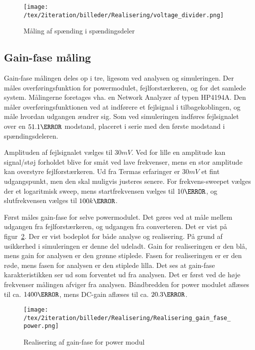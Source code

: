 \begin{figure}[H]
	\center
	\texttt{[image: /tex/2iteration/billeder/Realisering/voltage\_divider.png]}
	\caption{Måling af spænding i spændingsdeler}
	\label{fig:voltage_divider_realisering}
\end{figure}

\subsection{Gain-fase måling} \label{gain_fase_2}
Gain-fase målingen deles op i tre, ligesom ved analysen og simuleringen. Der måles overføringsfunktion for powermodulet, fejlforstærkeren, og for det samlede system. Målingerne foretages vha. en Network Analyzer af typen HP4194A\cite{hp4194}. Den måler overføringsfunktionen ved at indførere et fejlsignal i tilbagekoblingen, og måle hvordan udgangen ændrer sig. Som ved simuleringen indføres fejlsignalet over en $51.1\ohm$ modstand, placeret i serie med den første modstand i spændingsdeleren. 

Amplituden af fejlsignalet vælges til $30mV$. Ved for lille en amplitude kan signal/støj forholdet blive for småt ved lave frekvenser, mens en stor amplitude kan overstyre fejlforstærkeren. Ud fra Termas erfaringer er $30mV$ et fint udgangspunkt, men den skal muligvis justeres senere. For frekvens-sweepet vælges der et logaritmisk sweep, mens startfrekvensen vælges til $10\hertz$, og slutfrekvensen vælges til $100k\hertz$. 

Først måles gain-fase for selve powermodulet. Det gøres ved at måle mellem udgangen fra fejlforstærkeren, og udgangen fra converteren. Det er vist på figur~\ref{fig:realisering_gain_fase_power}. Der er vist bodeplot for både analyse og realisering. På grund af usikkerhed i simuleringen er denne del udeladt. Gain for realiseringen er den blå, mens gain for analysen er den grønne stiplede. Fasen for realiseringen er er den røde, mens fasen for analysen er den stiplede lilla. Det ses at gain-fase karakteristikken ser ud som forventet ud fra analysen. Det er først ved de høje frekvenser målingen afviger fra analysen. Båndbredden for power modulet aflæses til ca. $1400\hertz$, mens DC-gain aflæses til ca. $20.3\decibel$.

\begin{figure}[H]
	\center
	\texttt{[image: /tex/2iteration/billeder/Realisering/Realisering\_gain\_fase\_power.png]}
	\caption{Realisering af gain-fase for power modul}
	\label{fig:realisering_gain_fase_power}
\end{figure}

